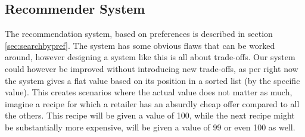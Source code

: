 \subsection{Recommender System}
\label{subsec:recommend}

The recommendation system, based on preferences is described in section \ref{sec:searchbypref}. The system has some obvious flaws that can be worked around, however designing a system like this is all about trade-offs. Our system could however be improved without introducing new trade-offs, as per right now the system gives a flat value based on its position in a sorted list (by the specific value). This creates scenarios where the actual value does not matter as much, imagine a recipe for which a retailer has an absurdly cheap offer compared to all the others. This recipe will be given a value of 100, while the next recipe might be substantially more expensive, will be given a value of 99 or even 100 as well.
